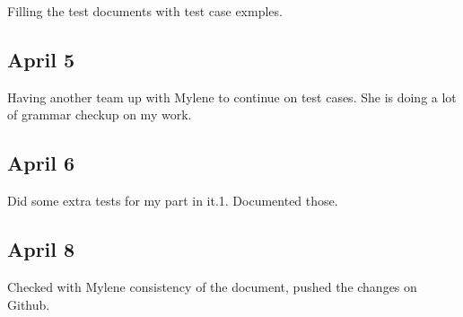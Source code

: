\documentclass[11pt,letterpaper]{article}
\begin{document}
Filling the test documents with test case exmples.

\subsection*{April 5}

Having another team up with Mylene to continue on test cases. She is doing a lot of grammar checkup on my work.

\subsection*{April 6}

Did some extra tests for my part in it.1. Documented those.

\subsection*{April 8}

Checked with Mylene consistency of the document, pushed the changes on Github.
\end{document}
